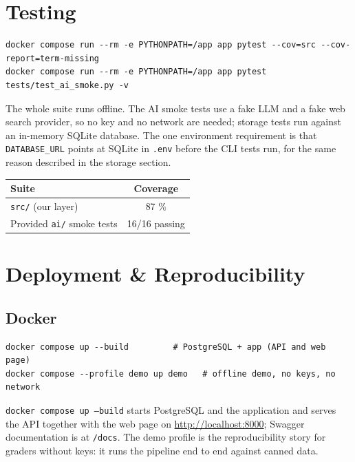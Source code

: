 \documentclass[11pt,a4paper]{article}
\newcommand{\code}[1]{\texttt{\small #1}}
\begin{document}
\section{Testing}

\begin{lstlisting}[style=shell,caption={Full suite with coverage, then the AI smoke tests}]
docker compose run --rm -e PYTHONPATH=/app app pytest --cov=src --cov-report=term-missing
docker compose run --rm -e PYTHONPATH=/app app pytest tests/test_ai_smoke.py -v
\end{lstlisting}

The whole suite runs offline. The AI smoke tests use a fake LLM and a fake web
search provider, so no key and no network are needed; storage tests run against
an in-memory SQLite database. The one environment requirement is that
\code{DATABASE\_URL} points at SQLite in \code{.env} before the CLI tests run,
for the same reason described in the storage section.

\begin{center}
\begin{tabular}{@{}lc@{}}
\toprule
\textbf{Suite} & \textbf{Coverage} \\
\midrule
\code{src/} (our layer) & 87 \% \\
Provided \code{ai/} smoke tests & 16/16 passing \\
\bottomrule
\end{tabular}
\end{center}

\section{Deployment \& Reproducibility}

\subsection{Docker}
\begin{lstlisting}[style=shell,caption={Full stack, then the keyless offline demo}]
docker compose up --build         # PostgreSQL + app (API and web page)
docker compose --profile demo up demo   # offline demo, no keys, no network
\end{lstlisting}

\code{docker compose up --build} starts PostgreSQL and the application and
serves the API together with the web page on \url{http://localhost:8000};
Swagger documentation is at \code{/docs}. The demo profile is the reproducibility
story for graders without keys: it runs the pipeline end to end against canned
data.
\end{document}
